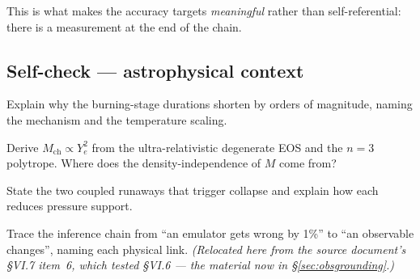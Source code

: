 This is what makes the accuracy targets \emph{meaningful} rather than
self-referential: there is a measurement at the end of the chain.

\subsection*{Self-check --- astrophysical context}
\label{sec:selfcheck-context}

\begin{selfcheck}
\item Explain why the burning-stage durations shorten by orders of magnitude,
      naming the mechanism and the temperature scaling.
\item Derive $M_{\mathrm{ch}} \propto Y_e^2$ from the ultra-relativistic
      degenerate EOS and the $n = 3$ polytrope. Where does the
      density-independence of $M$ come from?
\item State the two coupled runaways that trigger collapse and explain how each
      reduces pressure support.
\item Trace the inference chain from ``an emulator gets \Ye{} wrong by 1\%'' to
      ``an observable changes'', naming each physical link.
      \emph{(Relocated here from the source document's \S VI.7 item~6, which
      tested \S VI.6 --- the material now in \S\ref{sec:obsgrounding}.)}
\end{selfcheck}
